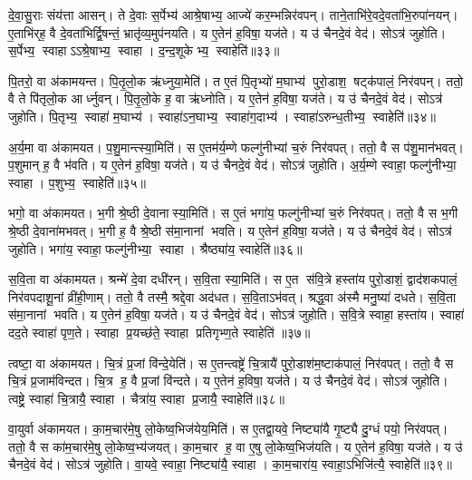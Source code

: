 दे॒वा॒सु॒राः संय॑त्ता आसन्।
ते दे॒वाः स॒र्पेभ्य॑ आश्रे॒षाभ्य॒ आज्ये॑ कर॒म्भन्निर॑वपन्।
ताने॒ताभि॑रे॒वदे॒वता॑भि॒रुपा॑नयन्।
ए॒ताभि॑र्‌ह॒ वै दे॒वता॑भिर्द्वि॒षन्तं॒ भ्रातृ॑व्य॒मुप॑नयति।
य ए॒तेन॑ ह॒विषा॒ यज॑ते।
य उ॑ चैनदे॒वं वेद॑।
सोऽत्र॑ जुहोति।
स॒र्पेभ्य॒ स्वाहाऽऽश्रे॒षाभ्य॒ स्वाहा।
द॒न्द॒शूकेभ्य॒ स्वाहेति॑॥३३॥

पि॒तरो॒ वा अ॑कामयन्त।
पि॒तृ॒लो॒क ऋ॑ध्नुया॒मेति॑।
त ए॒तं पि॒तृभ्यो॑ म॒घाभ्य॑ पुरो॒डाश॒ षट्क॑पालं॒ निर॑वपन्।
ततो॒ वै ते पि॑तृलो॒क आर्ध्नुवन्।
पि॒तृ॒लो॒के ह॒ वा ऋ॑ध्नोति।
य ए॒तेन॑ ह॒विषा॒ यज॑ते।
य उ॑ चैनदे॒वं वेद॑।
सोऽत्र॑ जुहोति।
पि॒तृभ्य॒ स्वाहा॑ म॒घाभ्य॑।
स्वाहा॑ऽन॒घाभ्य॒ स्वाहा॑ग॒दाभ्य॑।
स्वाहा॑ऽरुन्ध॒तीभ्य॒ स्वाहेति॑॥३४॥

अ॒र्य॒मा वा अ॑कामयत।
प॒शु॒मान्त्स्या॒मिति॑।
स ए॒तम॑र्य॒म्णे फल्गु॑नीभ्यां च॒रुं निर॑वपत्।
ततो॒ वै स प॑शु॒मान॑भवत्।
प॒शुमान् ह॒ वै भ॑वति।
य ए॒तेन॑ ह॒विषा॒ यज॑ते।
य उ॑ चैनदे॒वं वेद॑।
सोऽत्र॑ जुहोति।
अ॒र्य॒म्णे स्वाहा॒ फल्गु॑नीभ्या॒ स्वाहा।
प॒शुभ्य॒ स्वाहेति॑॥३५॥

भगो॒ वा अ॑कामयत।
भ॒गी श्रे॒ष्ठी दे॒वानास्या॒मिति॑।
स ए॒तं भगा॑य॒ फल्गु॑नीभ्यां च॒रुं निर॑वपत्।
ततो॒ वै स भ॒गी श्रे॒ष्ठी दे॒वाना॑मभवत्।
भ॒गी ह॒ वै श्रे॒ष्ठी स॑मा॒नानां भवति।
य ए॒तेन॑ ह॒विषा॒ यज॑ते।
य उ॑ चैनदे॒वं वेद॑।
सोऽत्र॑ जुहोति।
भगा॑य॒ स्वाहा॒ फल्गु॑नीभ्या॒ स्वाहा।
श्रैष्ठ्या॑य॒ स्वाहेति॑॥३६॥

स॒वि॒ता वा अ॑कामयत।
श्रन्मे॑ दे॒वा दधी॑रन्।
स॒वि॒ता स्या॒मिति॑।
स ए॒त स॑वि॒त्रे हस्ता॑य पुरो॒डाशं॒ द्वाद॑शकपालं॒ निर॑वपदाशू॒नां व्री॑ही॒णाम्।
ततो॒ वै तस्मै॒ श्रद्दे॒वा अद॑धत।
स॒वि॒ताऽभ॑वत्।
श्रद्ध॒वा अ॑स्मै मनु॒ष्या॑ दधते।
स॒वि॒ता स॑मा॒नानां भवति।
य ए॒तेन॑ ह॒विषा॒ यज॑ते।
य उ॑ चैनदे॒वं वेद॑।
सोऽत्र॑ जुहोति।
स॒वि॒त्रे स्वाहा॒ हस्ता॑य।
स्वाहा॑ दद॒ते स्वाहा॑ पृण॒ते।
स्वाहा प्र॒यच्छ॑ते॒ स्वाहा प्रतिगृभ्ण॒ते स्वाहेति॑ ॥३७॥

त्वष्टा॒ वा अ॑कामयत।
चि॒त्रं प्र॒जां वि॑न्दे॒येति॑।
स ए॒तन्त्वष्ट्रे॑ चि॒त्रायै॑ पुरो॒डाश॑म॒ष्टाक॑पालं॒ निर॑वपत्।
ततो॒ वै स चि॒त्रं प्र॒जाम॑विन्दत।
चि॒त्र ह॒ वै प्र॒जां वि॑न्दते।
य ए॒तेन॑ ह॒विषा॒ यज॑ते।
य उ॑ चैनदे॒वं वेद॑।
सोऽत्र॑ जुहोति।
त्वष्ट्रे॒ स्वाहा॑ चि॒त्रायै॒ स्वाहा।
चैत्रा॑य॒ स्वाहा प्र॒जायै॒ स्वाहेति॑॥३८॥

वा॒युर्वा अ॑कामयत।
का॒म॒चार॑मे॒षु लो॒केष्व॒भिज॑येय॒मिति॑।
स ए॒तद्वा॒यवे॒ निष्ट्या॑यै गृ॒ष्ट्यै दु॒ग्धं पयो॒ निर॑वपत्।
ततो॒ वै स का॑म॒चार॑मे॒षु लो॒केष्व॒भ्य॑जयत्।
का॒म॒चार ह॒ वा ए॒षु लो॒केष्व॒भिज॑यति।
य ए॒तेन॑ ह॒विषा॒ यज॑ते।
य उ॑ चैनदे॒वं वेद॑।
सोऽत्र॑ जुहोति।
वा॒यवे॒ स्वाहा॒ निष्ट्या॑यै॒ स्वाहा।
का॒म॒चारा॑य॒ स्वाहा॒ऽभिजि॑त्यै॒ स्वाहेति॑॥३९॥

